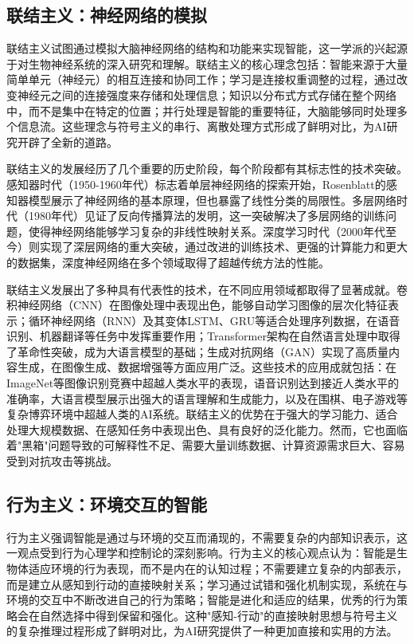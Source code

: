 \subsection{联结主义：神经网络的模拟}

联结主义试图通过模拟大脑神经网络的结构和功能来实现智能，这一学派的兴起源于对生物神经系统的深入研究和理解。联结主义的核心理念包括：智能来源于大量简单单元（神经元）的相互连接和协同工作；学习是连接权重调整的过程，通过改变神经元之间的连接强度来存储和处理信息；知识以分布式方式存储在整个网络中，而不是集中在特定的位置；并行处理是智能的重要特征，大脑能够同时处理多个信息流。这些理念与符号主义的串行、离散处理方式形成了鲜明对比，为AI研究开辟了全新的道路。

联结主义的发展经历了几个重要的历史阶段，每个阶段都有其标志性的技术突破。感知器时代（1950-1960年代）标志着单层神经网络的探索开始，Rosenblatt的感知器模型展示了神经网络的基本原理，但也暴露了线性分类的局限性。多层网络时代（1980年代）见证了反向传播算法的发明，这一突破解决了多层网络的训练问题，使得神经网络能够学习复杂的非线性映射关系。深度学习时代（2000年代至今）则实现了深层网络的重大突破，通过改进的训练技术、更强的计算能力和更大的数据集，深度神经网络在多个领域取得了超越传统方法的性能。

联结主义发展出了多种具有代表性的技术，在不同应用领域都取得了显著成就。卷积神经网络（CNN）在图像处理中表现出色，能够自动学习图像的层次化特征表示；循环神经网络（RNN）及其变体LSTM、GRU等适合处理序列数据，在语音识别、机器翻译等任务中发挥重要作用；Transformer架构在自然语言处理中取得了革命性突破，成为大语言模型的基础；生成对抗网络（GAN）实现了高质量内容生成，在图像生成、数据增强等方面应用广泛。这些技术的应用成就包括：在ImageNet等图像识别竞赛中超越人类水平的表现，语音识别达到接近人类水平的准确率，大语言模型展示出强大的语言理解和生成能力，以及在围棋、电子游戏等复杂博弈环境中超越人类的AI系统。联结主义的优势在于强大的学习能力、适合处理大规模数据、在感知任务中表现出色、具有良好的泛化能力。然而，它也面临着"黑箱"问题导致的可解释性不足、需要大量训练数据、计算资源需求巨大、容易受到对抗攻击等挑战。

\subsection{行为主义：环境交互的智能}

行为主义强调智能是通过与环境的交互而涌现的，不需要复杂的内部知识表示，这一观点受到行为心理学和控制论的深刻影响。行为主义的核心观点认为：智能是生物体适应环境的行为表现，而不是内在的认知过程；不需要建立复杂的内部表示，而是建立从感知到行动的直接映射关系；学习通过试错和强化机制实现，系统在与环境的交互中不断改进自己的行为策略；智能是进化和适应的结果，优秀的行为策略会在自然选择中得到保留和强化。这种"感知-行动"的直接映射思想与符号主义的复杂推理过程形成了鲜明对比，为AI研究提供了一种更加直接和实用的方法。

